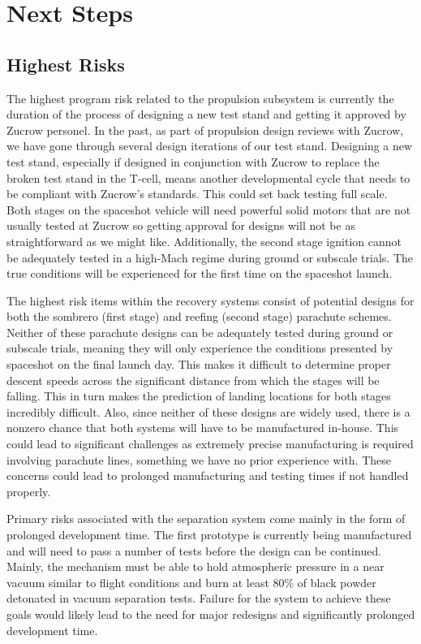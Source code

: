 \section{Next Steps} \label{section:nextsteps}
\subsection{Highest Risks}


The highest program risk related to the propulsion subsystem is currently the duration of the process of designing a new test stand and getting it approved by Zucrow personel. In the past, as part of propulsion design reviews with Zucrow, we have gone through several design iterations of our test stand. Designing a new test stand, especially if designed in conjunction with Zucrow to replace the broken test stand in the T-cell, means another developmental cycle that needs to be compliant with Zucrow's standards. This could set back testing full scale. Both stages on the spaceshot vehicle will need powerful solid motors that are not usually tested at Zucrow so getting approval for designs will not be as straightforward as we might like. Additionally, the second stage ignition cannot be adequately tested in a high-Mach regime during ground or subscale trials. The true conditions will be experienced for the first time on the spaceshot launch. 


The highest risk items within the recovery systems consist of potential designs for both the sombrero (first stage) and reefing (second stage) parachute schemes. Neither of these parachute designs can be adequately tested during ground or subscale trials, meaning they will only experience the conditions presented by spaceshot on the final launch day. This makes it difficult to determine proper descent speeds across the significant distance from which the stages will be falling. This in turn makes the prediction of landing locations for both stages incredibly difficult. Also, since neither of these designs are widely used, there is a nonzero chance that both systems will have to be manufactured in-house. This could lead to significant challenges as extremely precise manufacturing is required involving parachute lines, something we have no prior experience with. These concerns could lead to prolonged manufacturing and testing times if not handled properly.

Primary risks associated with the separation system come mainly in the form of prolonged development time. The first prototype is currently being manufactured and will need to pass a number of tests before the design can be continued. Mainly, the mechanism must be able to hold atmospheric pressure in a near vacuum similar to flight conditions and burn at least 80\% of black powder detonated in vacuum separation tests. Failure for the system to achieve these goals would likely lead to the need for major redesigns and significantly prolonged development time.


